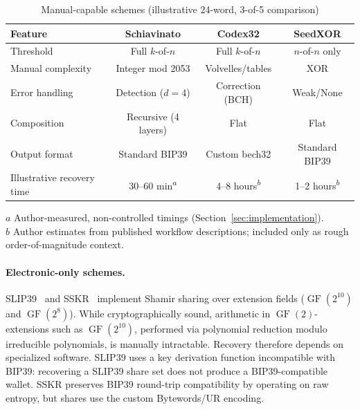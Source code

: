 \documentclass[11pt]{article}
\newcommand{\GF}{\operatorname{GF}}
\begin{document}
\begin{table}[H]
\centering
\caption{Manual-capable schemes (illustrative 24-word, 3-of-5 comparison)}
\label{tab:manual}
\small
\begin{tabular}{@{}lccc@{}}
\toprule
\textbf{Feature} & \textbf{Schiavinato} & \textbf{Codex32} & \textbf{SeedXOR} \\ \midrule
Threshold & Full $k$-of-$n$ & Full $k$-of-$n$ & $n$-of-$n$ only \\
Manual complexity & Integer mod 2053 & Volvelles/tables & XOR \\
Error handling & Detection ($d{=}4$) & Correction (BCH) & Weak/None \\
Composition & Recursive (4 layers) & Flat & Flat \\
Output format & Standard BIP39 & Custom bech32 & Standard BIP39 \\
Illustrative recovery time & 30--60 min\textsuperscript{$a$} & 4--8 hours\textsuperscript{$b$} & 1--2 hours\textsuperscript{$b$} \\
\bottomrule
\end{tabular}

\medskip
\footnotesize
$a$ Author-measured, non-controlled timings (Section~\ref{sec:implementation}).\\
$b$ Author estimates from published workflow descriptions; included only as rough order-of-magnitude context.
\end{table}

\paragraph{Electronic-only schemes.} SLIP39~\cite{slip39} and SSKR~\cite{sskr} implement Shamir sharing over extension fields ($\GF(2^{10})$ and $\GF(2^8)$). While cryptographically sound, arithmetic in $\GF(2)$-extensions such as $\GF(2^{10})$, performed via polynomial reduction modulo irreducible polynomials, is manually intractable. Recovery therefore depends on specialized software. SLIP39 uses a key derivation function incompatible with BIP39: recovering a SLIP39 share set does not produce a BIP39-compatible wallet. SSKR preserves BIP39 round-trip compatibility by operating on raw entropy, but shares use the custom Bytewords/UR encoding.
\end{document}
